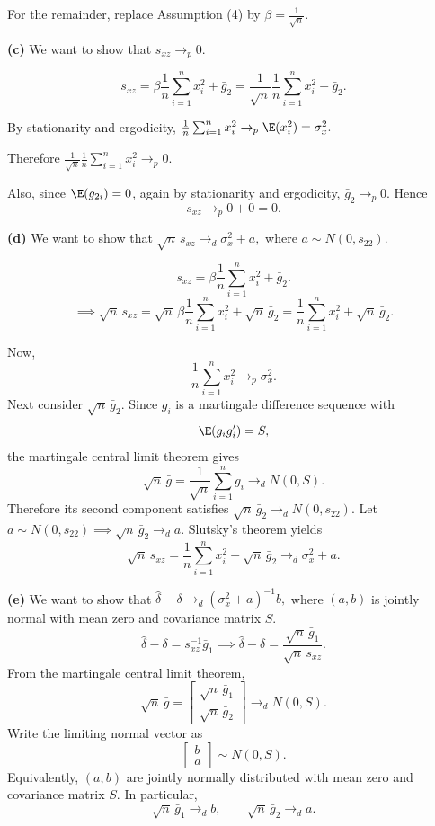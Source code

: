 \documentclass[12pt, letterpaper, onecolumn]{exam}
\begin{document}
\begin{solution}
    For the remainder, replace Assumption (4) by $\beta=\frac1{\sqrt n}.$

    \textbf{(c)} We want to show that $s_{xz}\to_p 0.$

    $$
        s_{xz}
        =
        \beta\frac1n\sum_{i=1}^n x_i^2+\bar g_2=\frac1{\sqrt n}\frac1n\sum_{i=1}^n x_i^2+\bar g_2.
    $$

    By stationarity and ergodicity, $\frac1n\sum_{i=1}^n x_i^2 \to_p \E(x_i^2)=\sigma_x^2.$

    Therefore $\frac1{\sqrt n}\frac1n\sum_{i=1}^n x_i^2 \to_p 0.$

    Also, since \(\E(g_{2i})=0\), again by stationarity and ergodicity, $\bar g_2\to_p 0.$
    Hence
    $$
        s_{xz}\to_p 0+0=0.
    $$

    \textbf{(d)} We want to show that $\sqrt n\, s_{xz}\to_d \sigma_x^2+a,$ where \(a\sim N(0,s_{22})\).

    $$
        s_{xz}
        =
        \beta\frac1n\sum_{i=1}^n x_i^2+\bar g_2.
    $$
    $$
        \implies
        \sqrt n\, s_{xz}
        =
        \sqrt n\,\beta\frac1n\sum_{i=1}^n x_i^2+\sqrt n\,\bar g_2=\frac1n\sum_{i=1}^n x_i^2+\sqrt n\,\bar g_2.
    $$

    Now,
    $$
        \frac1n\sum_{i=1}^n x_i^2 \to_p \sigma_x^2.
    $$
    Next consider \(\sqrt n\,\bar g_2\). Since \(g_i\) is a martingale difference sequence with
    $$
        \E(g_i g_i')=S,
    $$
    the martingale central limit theorem gives
    $$
        \sqrt n\,\bar g
        =
        \frac1{\sqrt n}\sum_{i=1}^n g_i
        \to_d N(0,S).
    $$
    Therefore its second component satisfies $\sqrt n\,\bar g_2 \to_d N(0,s_{22}).$
    Let $a\sim N(0,s_{22}) \implies \sqrt n\,\bar g_2 \to_d a.$
    Slutsky's theorem yields
    $$
        \sqrt n\, s_{xz}
        =
        \frac1n\sum_{i=1}^n x_i^2+\sqrt n\,\bar g_2
        \to_d \sigma_x^2+a.
    $$

    \textbf{(e)} We want to show that $\hat\delta-\delta\to_d (\sigma_x^2+a)^{-1}b,$
    where \((a,b)\) is jointly normal with mean zero and covariance matrix \(S\).
    $$
        \hat\delta-\delta=s_{xz}^{-1}\bar g_1
        \implies
        \hat\delta-\delta
        =
        \frac{\sqrt n\,\bar g_1}{\sqrt n\, s_{xz}}.
    $$
    From the martingale central limit theorem,
    $$
        \sqrt n\,\bar g
        =
        \begin{bmatrix}
            \sqrt n\,\bar g_1 \\
            \sqrt n\,\bar g_2
        \end{bmatrix}
        \to_d
        N(0,S).
    $$
    Write the limiting normal vector as
    $$
        \begin{bmatrix}
            b \\
            a
        \end{bmatrix}
        \sim N(0,S).
    $$
    Equivalently, \((a,b)\) are jointly normally distributed with mean zero and covariance matrix \(S\). In particular,
    $$
        \sqrt n\,\bar g_1\to_d b,
        \qquad
        \sqrt n\,\bar g_2\to_d a.
    $$


\end{solution}
\end{document}

